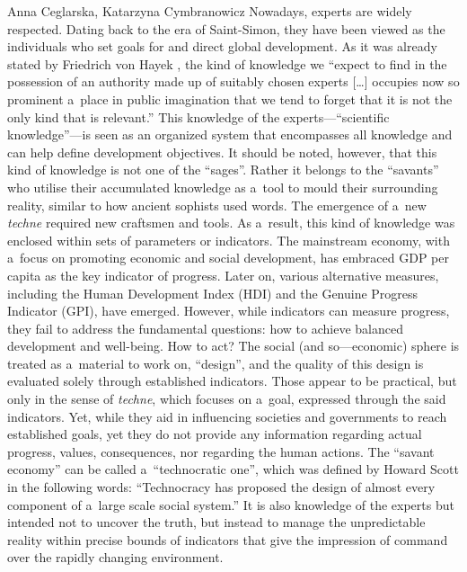 \begin{artengenv2auth}{Anna Ceglarska, Katarzyna Cymbranowicz}
Nowadays, experts are widely respected. Dating back to the era of Saint-Simon, they have been viewed as the individuals who set goals for and direct global development. As it was already stated by Friedrich von Hayek 
\parencite*[][p.521]{hayek_use_1945}, %
 the kind of knowledge we ``expect to find in the possession of an authority made up of suitably chosen experts […] occupies now so prominent a~place in public imagination that we tend to forget that it is not the only kind that is relevant.'' This knowledge of the experts---``scientific knowledge''---is seen as an organized system that encompasses all knowledge and can help define development objectives. It should be noted, however, that this kind of knowledge is not one of the ``sages''. Rather it belongs to the ``savants'' who utilise their accumulated knowledge as a~tool to mould their surrounding reality, similar to how ancient sophists used words. The emergence of a~new \textit{techne} required new craftsmen and tools. As a~result, this kind of knowledge was enclosed within sets of parameters or indicators. The mainstream economy, with a~focus on promoting economic and social development, has embraced GDP per capita as the key indicator of progress. Later on, various alternative measures, including the Human Development Index (HDI) and the Genuine Progress Indicator (GPI), have emerged. However, while indicators can measure progress, they fail to address the fundamental questions: how to achieve balanced development and well-being. How to act? The social (and so---economic) sphere is treated as a~material to work on, ``design'', and the quality of this design is evaluated solely through established indicators. Those appear to be practical, but only in the sense of \textit{techne}, which focuses on a~goal, expressed through the said indicators. Yet, while they aid in influencing societies and governments to reach established goals, yet they do not provide any information regarding actual progress, values, consequences, nor regarding the human actions. The ``savant economy'' can be called a~``technocratic one'', which was defined by Howard Scott 
\parencite*[][p.10]{scott_history_1965} %
 in the following words: ``Technocracy has proposed the design of almost every component of a~large scale social system.'' It is also knowledge of the experts but intended not to uncover the truth, but instead to manage the unpredictable reality within precise bounds of indicators that give the impression of command over the rapidly changing environment.




\end{artengenv2auth}
